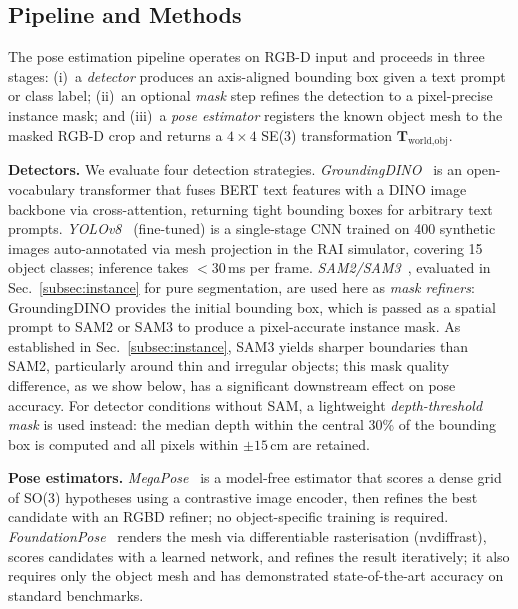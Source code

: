 \documentclass[conference,letterpaper,10pt]{IEEEtran}
\begin{document}
\subsection{Pipeline and Methods}
\label{subsec:pose_pipeline}

The pose estimation pipeline operates on RGB-D input and proceeds in three stages:
(i)~a \emph{detector} produces an axis-aligned bounding box given a
text prompt or class label;
(ii)~an optional \emph{mask} step refines the detection to a
pixel-precise instance mask; and
(iii)~a \emph{pose estimator} registers the known object mesh to the
masked RGB-D crop and returns a $4\times4$ SE(3) transformation
$\mathbf{T}_{\text{world},\text{obj}}$.

\textbf{Detectors.}
We evaluate four detection strategies.
\emph{GroundingDINO}~\cite{gdino} is an open-vocabulary transformer that
fuses BERT text features with a DINO image backbone via cross-attention,
returning tight bounding boxes for arbitrary text prompts.
\emph{YOLOv8}~\cite{yolov8} (fine-tuned) is a single-stage CNN trained
on 400 synthetic images auto-annotated via mesh projection in the RAI
simulator, covering 15 object classes; inference takes $<30$\,ms per
frame.
\emph{SAM2/SAM3}~\cite{sam2,sam3}, evaluated in Sec.~\ref{subsec:instance}
for pure segmentation, are used here as \emph{mask refiners}:
GroundingDINO provides the initial bounding box, which is passed as a
spatial prompt to SAM2 or SAM3 to produce a pixel-accurate instance
mask. As established in Sec.~\ref{subsec:instance}, SAM3 yields
sharper boundaries than SAM2, particularly around thin and irregular
objects; this mask quality difference, as we show below, has a
significant downstream effect on pose accuracy.
For detector conditions without SAM, a lightweight
\emph{depth-threshold mask} is used instead: the median depth within
the central 30\% of the bounding box is computed and all pixels within
$\pm15$\,cm are retained.

\textbf{Pose estimators.}
\emph{MegaPose}~\cite{megapose} is a model-free estimator that scores a
dense grid of SO(3) hypotheses using a contrastive image encoder, then
refines the best candidate with an RGBD refiner; no object-specific
training is required.
\emph{FoundationPose}~\cite{foundationpose} renders the mesh via
differentiable rasterisation (nvdiffrast), scores candidates with a
learned network, and refines the result iteratively; it also requires
only the object mesh and has demonstrated state-of-the-art accuracy on
standard benchmarks.
\end{document}
